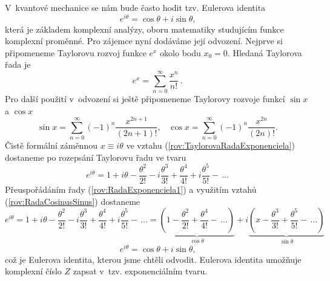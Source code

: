 V~kvantové mechanice se nám bude často hodit tzv. Eulerova identita
\begin{equation}
 e^{i \theta} = \cos \theta + i \sin \theta \mbox{,}
\label{rov:EulerovaIdentita}
\end{equation}
která je základem komplexní analýzy, oboru matematiky studujícím funkce komplexní proměnné. Pro zájemce nyní dodáváme její odvození. Nejprve si připomeneme Taylorovu rozvoj funkce $e^{x}$ okolo bodu $x_0 = 0$. Hledaná Taylorova řada je
\begin{equation}
e^x = \sum_{n=0}^{\infty} \frac{x^n}{n!} \,\mbox{.}
\label{rov:TaylorovaRadaExponenciela}
\end{equation}
Pro další použití v~odvození si ještě připomeneme Taylorovy rozvoje funkcí $\sin x$ a $\cos x$
\begin{equation}
\sin x = \sum_{n=0}^{\infty} (-1)^{n} \frac{x^{2n+1}}{(2n+1)!} \mbox{,} \quad \cos x = \sum_{n=0}^{\infty} (-1)^{n} \frac{x^{2n}}{(2n)!} \mbox{.}
\label{rov:RadaCosinusSinus}
\end{equation}
Čistě formální záměnnou $x \equiv i \theta$ ve vztahu (\ref{rov:TaylorovaRadaExponenciela}) dostaneme po rozepsání Taylorovu řadu ve tvaru
\begin{equation}
e^{i\theta} = 1 + i\theta - \frac{\theta^2}{2!} - i \frac{\theta^3}{3!} + \frac{\theta^4}{4!} + i \frac{\theta^5}{5!} -\,\dots
\label{rov:RadaExponenciela1}
\end{equation}
Přeuspořádáním řady (\ref{rov:RadaExponenciela1}) a využitím vztahů (\ref{rov:RadaCosinusSinus}) dostaneme
\newpage
\begin{displaymath}
e^{i\theta} = 1 + i\theta - \frac{\theta^2}{2!} - i \frac{\theta^3}{3!} + \frac{\theta^4}{4!} + i \frac{\theta^5}{5!} -\,\dots =\underbrace{\left(1 - \frac{\theta^2}{2!} + \frac{\theta^4}{4!} - \,\dots \right)}_{\cos \theta} + i \underbrace{\left(x - \frac{\theta^3}{3!} + \frac{\theta^5}{5!} - \,\dots \right)}_{\sin \theta}
\end{displaymath}
\begin{equation}
e^{i\theta} = \cos \theta + i\sin \theta \mbox{,}
\label{rov:DukazEulerovaIdentita}
\end{equation}
což je Eulerova identita, kterou jsme chtěli odvodit. Eulerova identita umožňuje komplexní číslo $Z$ zapsat v~tzv. exponenciálním tvaru.

